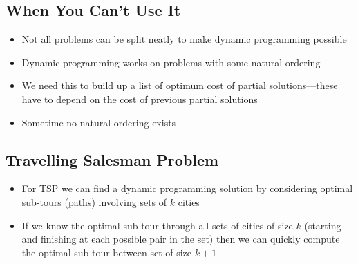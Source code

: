 \begin{slide}
\section{When You Can't Use It}

\begin{PauseHighLight}
  \begin{itemize}
  \item Not all problems can be split neatly to make dynamic programming
    possible\pause
  \item Dynamic programming works on problems with some natural
    ordering\pause 
  \item We need this to build up a list of optimum cost of partial
    solutions---these have to depend on the cost of previous partial
    solutions\pause
  \item Sometime no natural ordering exists\pause
  \end{itemize}
\end{PauseHighLight}

\end{slide}


\begin{slide}
\section[-2]{Travelling Salesman Problem}

\pb
\begin{itemize}
\item For TSP we can find a dynamic programming solution by
  considering optimal sub-tours (paths) involving sets of $k$
  cities\pauseh
\item If we know the optimal sub-tour through all sets of cities of
  size $k$ (starting and finishing at each possible pair in the set)
  then we can quickly compute the optimal sub-tour between set of size
  $k+1$\pauseh
  \begin{center}
    \pause  
  \end{center}
\end{itemize}


\end{slide}


